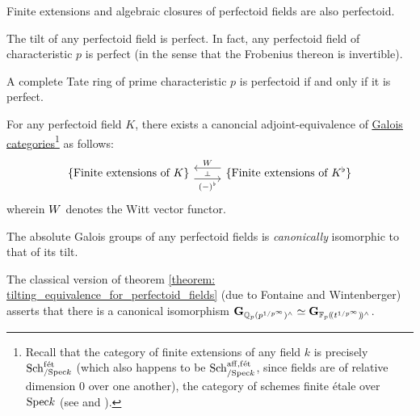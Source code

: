                 \begin{lemma}
                    Finite extensions and algebraic closures of perfectoid fields are also perfectoid.  
                \end{lemma}
                \begin{lemma} \label{prop: tilts_are_perfect}
                    The tilt of any perfectoid field is perfect. In fact, any perfectoid field of characteristic $p$ is perfect (in the sense that the Frobenius thereon is invertible).  
                \end{lemma}
                \begin{lemma} \label{prop: tilts_are_perfectoid}
                    A complete Tate ring of prime characteristic $p$ is perfectoid if and only if it is perfect.
                \end{lemma}
                \begin{theorem} \label{theorem: tilting_equivalence_for_perfectoid_fields}
                    For any perfectoid field $K$, there exists a canoncial adjoint-equivalence of \href{https://stacks.math.columbia.edu/tag/0BMQ}{\underline{Galois categories}}\footnote{Recall that the category of finite extensions of any field $k$ is precisely $\mathrm{Sch}_{/\mathrm{Spec} k}^{\mathrm{f\acute{e}t}}$ (which also happens to be $\mathrm{Sch}_{/\mathrm{Spec} k}^{\mathrm{aff}, \mathrm{f\acute{e}t}}$, since fields are of relative dimension $0$ over one another), the category of schemes finite \'etale over $\mathrm{Spec} k$ (see \cite[\href{https://stacks.math.columbia.edu/tag/0BL6}{Tag 0BL6}]{stacks} and \cite[\href{https://stacks.math.columbia.edu/tag/00U3}{Tag 00U3}]{stacks}).} as follows:
                        $$
                            \begin{tikzcd}
                            	{\{\text{Finite extensions of $K$}\}} & {\{\text{Finite extensions of $K^{\flat}$}\}}
                            	\arrow[""{name=0, anchor=center, inner sep=0}, "{(-)^{\flat}}"', shift right=2, from=1-1, to=1-2]
                            	\arrow[""{name=1, anchor=center, inner sep=0}, "\Witt"', shift right=2, from=1-2, to=1-1]
                            	\arrow["\dashv"{anchor=center, rotate=-90}, draw=none, from=1, to=0]
                            \end{tikzcd}
                        $$
                    wherein $W$ denotes the Witt vector functor.
                \end{theorem}
                \begin{corollary}
                    The absolute Galois groups of any perfectoid fields is \textit{canonically} isomorphic to that of its tilt.
                \end{corollary}
                \begin{example}
                    The classical version of theorem \ref{theorem: tilting_equivalence_for_perfectoid_fields} (due to Fontaine and Wintenberger) asserts that there is a canonical isomorphism $\mathbf{G}_{\mathbb{Q}_p(p^{1/p^{\infty}})^{\wedge}} \simeq \mathbf{G}_{\mathbb{F}_p(\!(t^{1/p^{\infty}})\!)^{\wedge}}$.
                \end{example}
                

